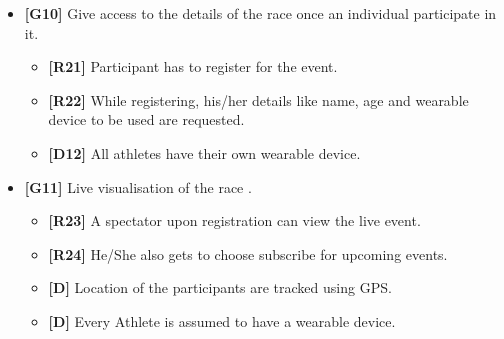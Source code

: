 \begin{itemize}
\item\textbf{[G10]} Give access to the details of the race once an individual participate in it.

\begin{itemize}
\item\textbf{[R21]} Participant has to register for the event.
\item\textbf{[R22]} While registering, his/her details like name, age and wearable device to be used are requested.
\item\textbf{[D12]} All athletes have their own wearable device.\newline
\end{itemize}

\item\textbf{[G11]} Live visualisation of the race .

\begin{itemize}
\item\textbf{[R23]} A spectator upon registration can view the live event.
\item\textbf{[R24]} He/She also gets to choose subscribe for upcoming events.
\item\textbf{[D]} Location of the participants are tracked using GPS.
\item\textbf{[D]} Every Athlete is assumed to have a wearable device.
\end{itemize}

\end{itemize}
